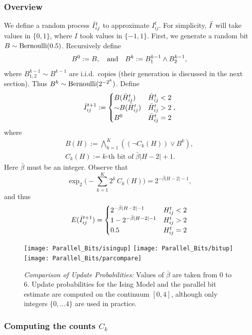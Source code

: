 \subsubsection{Overview}
We define a random process $\bar{I}_{ij}^t$ to approximate $I_{ij}^t$.  For simplicity,
$\bar{I}$ will take values in $\{0,1\}$, where $I$ took values in $\{-1,1\}$.
First, we generate a random bit $B \sim \operatorname{Bernoulli}(0.5)$. Recursively define
\begin{equation}
B^0 := B,\quad\text{and}\quad B^k := B^{k-1}_1\wedge B^{k-1}_2 ,
\end{equation}
where $B^{k-1}_{1,2} \sim B^{k-1}$ are i.i.d.\ copies (their generation is discussed in the next section).
Thus $B^k \sim \operatorname{Bernoulli}(2^{-2^k})$.
Define
\begin{equation}
 \bar{I}^{t+1}_{ij} := \begin{cases}
B(\bar H_{ij}^t) & \bar H_{ij}^t<2\\
\mathord{\sim} B(\bar H_{ij}^t) & \bar H_{ij}^t>2\\
B^0 & \bar H_{ij}^t=2
\end{cases},
\end{equation}
where
\begin{gather}
B(H) := \bigwedge_{k=1}^K((\neg C_k(H))\vee B^k),\\
C_k(H) := \text{$k$-th bit of}\; \bar{\beta}|H-2|+1.
\end{gather}
Here $\bar\beta$ must be an integer. Observe that 
$$\exp_2\bigl(-\sum_{k=1}^K 2^k\,C_k(H)\bigr) =  2^{-\bar\beta |H-2|-1},$$
and thus
\begin{equation}
E(\bar{I}^{t+1}_{ij}) = 
\begin{cases}
2^{-\bar\beta |H-2|-1} & H_{ij}^t < 2\\
1-2^{-\bar\beta |H-2|-1} & H_{ij}^t > 2\\
0.5 & H_{ij}^t = 2
\end{cases}
\end{equation}

\begin{figure}
\texttt{[image: Parallel\_Bits/isingup]}\quad
\texttt{[image: Parallel\_Bits/bitup]}\quad
\texttt{[image: Parallel\_Bits/parcompare]}
\caption{\emph{Comparison of Update Probabilities:} 
Values of $\bar\beta$ are taken from 0 to 6.  
Update probabilities for the Ising Model and
the parallel bit estimate are computed on the continuum $[0,4]$, 
although only integers $\{0, \ldots 4\}$ are used in practice.\label{fig: parcompare}}
\end{figure}
\subsubsection{Computing the counts $C_k$}


